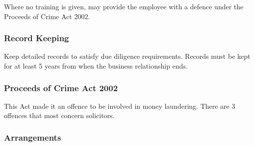 \documentclass[
]{article}
\begin{document}
Where no training is given, may provide the employee with a defence
under the Proceeds of Crime Act 2002.

\hypertarget{record-keeping}{%
\subsubsection{Record Keeping}\label{record-keeping}}

Keep detailed records to satisfy due diligence requirements. Records
must be kept for at least 5 years from when the business relationship
ends.

\hypertarget{proceeds-of-crime-act-2002}{%
\subsubsection{Proceeds of Crime Act
2002}\label{proceeds-of-crime-act-2002}}

This Act made it an offence to be involved in money laundering. There
are 3 offences that most concern solicitors.

\hypertarget{arrangements}{%
\subsubsection{Arrangements}\label{arrangements}}
\end{document}
